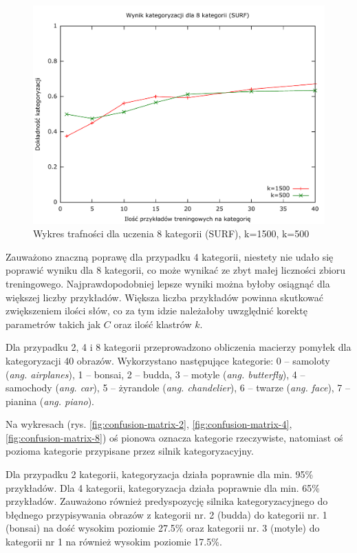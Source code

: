 \begin{figure}[h]
	\centering
	\includegraphics[scale=0.8]{graphics/04_interpretacja_wynikow/result-surf-8-1500-500.pdf}
	\caption{ Wykres trafności dla uczenia 8 kategorii (SURF), k=1500, k=500 }
	\label{fig:result-surf-8-1500-500}
\end{figure}

Zauważono znaczną poprawę dla przypadku 4 kategorii, niestety nie udało się poprawić wyniku dla 8 kategorii, co może wynikać ze zbyt małej liczności zbioru treningowego. Najprawdopodobniej lepsze wyniki można byłoby osiągnąć dla większej liczby przykładów. Większa liczba przykładów powinna skutkować zwiększeniem ilości słów, co za tym idzie należałoby uwzględnić korektę parametrów takich jak $C$ oraz ilość klastrów $k$.

Dla przypadku 2, 4 i 8 kategorii przeprowadzono obliczenia macierzy pomyłek dla kategoryzacji 40 obrazów. Wykorzystano następujące kategorie:
 0 -- samoloty (\emph{ang. airplanes}),
 1 -- bonsai,
 2 -- budda,
 3 -- motyle (\emph{ang. butterfly}),
 4 -- samochody (\emph{ang. car}),
 5 -- żyrandole (\emph{ang. chandelier}),
 6 -- twarze (\emph{ang. face}),
 7 -- pianina (\emph{ang. piano}).

Na wykresach (rys. \ref{fig:confusion-matrix-2}, \ref{fig:confusion-matrix-4}, \ref{fig:confusion-matrix-8}) oś pionowa oznacza kategorie rzeczywiste, natomiast oś pozioma kategorie przypisane przez silnik kategoryzacyjny.

Dla przypadku 2 kategorii, kategoryzacja działa poprawnie dla min. 95\% przykładów. Dla 4 kategorii, kategoryzacja działa poprawnie dla min. 65\% przykładów. Zauważono również predyspozycję silnika kategoryzacyjnego do błędnego przypisywania obrazów z kategorii nr. 2 (budda) do kategorii nr. 1 (bonsai) na dość wysokim poziomie 27.5\% oraz kategorii nr. 3 (motyle) do kategorii nr 1 na również wysokim poziomie 17.5\%.


